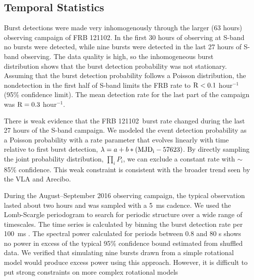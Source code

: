 \documentclass[twocolumn]{aastex61}
\newcommand{\frb}{FRB 121102}
\begin{document}
\subsection{Temporal Statistics}
Burst detections were made very inhomogenously through the larger (63 hours) observing campaign of FRB 121102. In the first 30 hours of observing at S-band no bursts were detected, while nine bursts were detected in the last 27 hours of S-band observing. The data quality is high, so the inhomogeneous burst distribution shows that the burst detection probability was not stationary. Assuming that the burst detection probability follows a Poisson distribution, the nondetection in the first half of S-band limits the FRB rate to $\rm{R}<0.1$ hour$^{-1}$ (95\% confidence limit). The mean detection rate for the last part of the campaign was $\rm{R}=0.3$ hour$^{-1}$.

There is weak evidence that the \frb\ burst rate changed during the last 27 hours of the S-band campaign. We modeled the event detection probability as a Poisson probability with a rate parameter that evolves linearly with time relative to first burst detection, $\lambda = a + b * (\rm{MJD}_i - 57623)$. By directly sampling the joint probability distribution, $\prod_{i} P_i$, we can exclude a constant rate with $\sim$85\% confidence. This weak constraint is consistent with the broader trend seen by the VLA and Arecibo.


During the August--September 2016 observing campaign, the typical observation lasted about two hours and was sampled with a 5~ms cadence. We used the Lomb-Scargle periodogram \citep{1982ApJ...263..835S} to search for periodic structure over a wide range of timescales. The time series is calculated by binning the burst detection rate per 100~ms \citep[always either 0 or 1, see also]{2011MNRAS.417.1871P}. 
The spectral power calculated for periods between 0.8 and 80 s shows no power in excess of the typical 95\% confidence bound estimated from shuffled data. We verified that simulating nine bursts drawn from a simple rotational model would produce excess power using this approach. However, it is difficult to put strong constraints on more complex rotational models \citep[e.g., with wide pulse phase windows or glitches][]{2007ApJ...663..497C, 2013Natur.497..591A}
\end{document}
